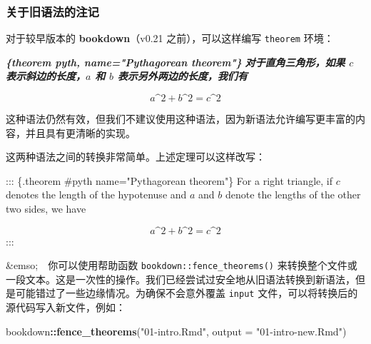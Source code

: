 \documentclass[
  12pt,
]{krantz}
\newenvironment{Shaded}{\begin{snugshade}}{\end{snugshade}}
\newcommand{\AttributeTok}[1]{\textcolor[rgb]{0.13,0.29,0.53}{#1}}
\newcommand{\FunctionTok}[1]{\textcolor[rgb]{0.13,0.29,0.53}{\textbf{#1}}}
\newcommand{\InformationTok}[1]{\textcolor[rgb]{0.56,0.35,0.01}{\textbf{\textit{#1}}}}
\newcommand{\NormalTok}[1]{#1}
\newcommand{\SpecialCharTok}[1]{\textcolor[rgb]{0.81,0.36,0.00}{\textbf{#1}}}
\newcommand{\StringTok}[1]{\textcolor[rgb]{0.31,0.60,0.02}{#1}}
\theoremstyle{definition}
\theoremstyle{definition}
\theoremstyle{definition}
\theoremstyle{definition}
\theoremstyle{remark}
\begin{document}
\hypertarget{theorem-engine}{%
\subsubsection{关于旧语法的注记}\label{theorem-engine}}

对于较早版本的 \textbf{bookdown}（v0.21 之前），可以这样编写 \texttt{theorem} 环境：

\begin{Shaded}
\begin{Highlighting}[]
\InformationTok{\textasciigrave{}\textasciigrave{}\textasciigrave{}\{theorem pyth, name="Pythagorean theorem"\}}
\InformationTok{对于直角三角形，如果 $c$ 表示斜边的长度，$a$ 和 $b$ 表示另外两边的长度，我们有}

\InformationTok{$$a\^{}2 + b\^{}2 = c\^{}2$$}
\InformationTok{\textasciigrave{}\textasciigrave{}\textasciigrave{}}
\end{Highlighting}
\end{Shaded}

这种语法仍然有效，但我们不建议使用这种语法，因为新语法允许编写更丰富的内容，并且具有更清晰的实现。

这两种语法之间的转换非常简单。上述定理可以这样改写：

\begin{Shaded}
\begin{Highlighting}[]
\NormalTok{::: \{.theorem \#pyth name="Pythagorean theorem"\}}
\NormalTok{For a right triangle, if $c$ denotes the length of the hypotenuse}
\NormalTok{and $a$ and $b$ denote the lengths of the other two sides, we have}

\NormalTok{$$a\^{}2 + b\^{}2 = c\^{}2$$}
\NormalTok{:::}
\end{Highlighting}
\end{Shaded}

\&emso; 你可以使用帮助函数 \texttt{bookdown::fence\_theorems()} 来转换整个文件或一段文本。这是一次性的操作。我们已经尝试过安全地从旧语法转换到新语法，但是可能错过了一些边缘情况。为确保不会意外覆盖 \texttt{input} 文件，可以将转换后的源代码写入新文件，例如：

\begin{Shaded}
\begin{Highlighting}[]
\NormalTok{bookdown}\SpecialCharTok{::}\FunctionTok{fence\_theorems}\NormalTok{(}\StringTok{"01{-}intro.Rmd"}\NormalTok{, }\AttributeTok{output =} \StringTok{"01{-}intro{-}new.Rmd"}\NormalTok{)}
\end{Highlighting}
\end{Shaded}
\end{document}
